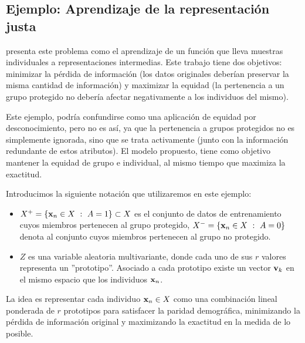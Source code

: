 \documentclass[oneside,openright,titlepage,numbers=noenddot,openany,headinclude,footinclude=true,
cleardoublepage=empty,abstractoff,BCOR=5mm,paper=a4,fontsize=12pt,main=spanish]{scrreprt}
\begin{document}
\subsection{Ejemplo: Aprendizaje de la representación justa}

\cite{fairrepresentation2013} presenta  este problema como el aprendizaje de un función que lleva muestras individuales a representaciones intermedias. Este trabajo tiene dos objetivos: minimizar la pérdida de información (los datos originales deberían preservar la misma cantidad de información) y maximizar la equidad (la pertenencia a un grupo protegido no debería afectar negativamente a los individuos del mismo). 

Este ejemplo, podría confundirse como una aplicación de equidad por desconocimiento, pero no es así, ya que la pertenencia a grupos protegidos no es simplemente ignorada, sino que se trata activamente (junto con la información redundante de estos atributos). El modelo propuesto, tiene como objetivo mantener la equidad de grupo e individual, al mismo tiempo que maximiza la exactitud.

\begin{notation}
Introducimos la siguiente notación que utilizaremos en este ejemplo:

\begin{itemize}
    \item $X^+=\{\nm{x}_n \in X \ : \ A=1\}\subset X$ es el conjunto de datos de entrenamiento cuyos miembros pertenecen al grupo protegido, $X^-=\{\textbf{x}_n \in X \ : \ A=0\}$ denota al conjunto cuyos miembros pertenecen al grupo no protegido.
    \item $Z$ es una variable aleatoria multivariante, donde cada uno de sus $r$ valores representa un ''prototipo''. Asociado a cada prototipo existe un vector $\textbf{v}_k$ en el mismo espacio que los individuos $\textbf{x}_n$.
\end{itemize}
\end{notation}

La idea es representar cada individuo $\textbf{x}_n \in X$ como una combinación lineal ponderada de $r$ prototipos para satisfacer la paridad demográfica, minimizando la pérdida de información original y maximizando la exactitud en la medida de lo posible.
\end{document}
